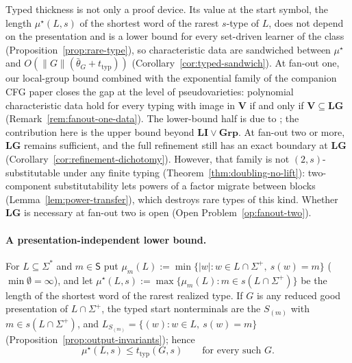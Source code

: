 Typed thickness is not only a proof device.  Its value at the start
symbol, the length $\mu^\star(L,s)$ of the shortest word of the rarest
$s$-type of $L$, does not depend on the presentation and is a lower
bound for every set-driven learner of the class
(Proposition~\ref{prop:rare-type}), so characteristic data are
sandwiched between $\mu^\star$ and $O(\|G\|(\bar\theta_G+t_{\mathrm{typ}}))$
(Corollary~\ref{cor:typed-sandwich}).  At fan-out one, our local-group
bound combined with the exponential family of the companion CFG paper
\cite[Prop.~6.4]{kuriyamaCFG} closes the gap at the level of
pseudovarieties: polynomial characteristic data hold for every typing
with image in $\mathbf V$ if and only if $\mathbf V\subseteq\mathbf{LG}$
(Remark~\ref{rem:fanout-one-data}).  The lower-bound half is due to
\cite{kuriyamaCFG}; the contribution here is the upper bound beyond
$\mathbf{LI}\vee\mathbf{Grp}$.
At fan-out two or more, $\mathbf{LG}$ remains sufficient, and the full
refinement still has an exact boundary at $\mathbf{LG}$
(Corollary~\ref{cor:refinement-dichotomy}).  However, that family is
not $(2,s)$-substitutable under any finite typing
(Theorem~\ref{thm:doubling-no-lift}): two-component substitutability
lets powers of a factor migrate between blocks
(Lemma~\ref{lem:power-transfer}), which destroys rare types of this
kind.  Whether $\mathbf{LG}$ is necessary at fan-out two is open
(Open Problem~\ref{op:fanout-two}).


\paragraph{A presentation-independent lower bound.}
For $L\subseteq\Sigma^*$ and $m\in\mathsf S$ put
$\mu_m(L):=\min\{|w|:w\in L\cap\Sigma^+,\ s(w)=m\}$ ($\min\emptyset=\infty$),
and let $\mu^\star(L,s):=\max\{\mu_m(L):m\in s(L\cap\Sigma^+)\}$ be the
length of the shortest word of the rarest realized type.  If $G$ is any
reduced good presentation of $L\cap\Sigma^+$, the typed start
nonterminals are the $S_{(m)}$ with $m\in s(L\cap\Sigma^+)$, and
$L_{S_{(m)}}=\{(w):w\in L,\ s(w)=m\}$
(Proposition~\ref{prop:output-invariants}); hence
\begin{equation}
\label{eq:root-thickness}
 \mu^\star(L,s)\le t_{\mathrm{typ}}(G,s)\qquad\text{for every such }G.
\end{equation}

